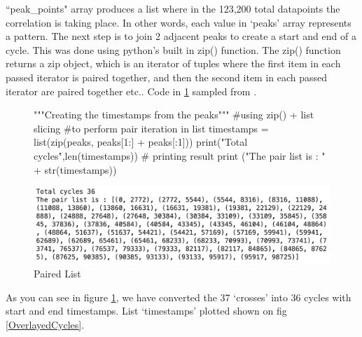 ``peak\_points" array produces a list where in the 123,200 total datapoints the correlation is taking place. In other words, each value in ‘peaks’ array represents a pattern. The next step is to join 2 adjacent peaks to create a start and end of a cycle. This was done using python's built in zip() function. The zip() function returns a zip object, which is an iterator of tuples where the first item in each passed iterator is paired together, and then the second item in each passed iterator are paired together etc.\cite{defZip}. Code in \ref{Paired List} sampled from \cite{paiedList}.

\begin{figure}[h]
\centering

\begin{python}
"""Creating the timestamps from the peaks""" 
#using zip() + list slicing 
#to perform pair iteration in list
timestamps = list(zip(peaks, peaks[1:] + peaks[:1]))
print("Total cycles",len(timestamps))
# printing result
print ("The pair list is : " + str(timestamps))
\end{python}

\includegraphics[scale=0.5]{images/arrayPeaks.png}
\caption{Paired List}
\label{Paired List}
\end{figure}

As you can see in figure \ref{Paired List}, we have converted the 37 
`crosses' into 36 cycles with start and end timestamps. List `timestamps' plotted shown on fig \ref{OverlayedCycles}.


